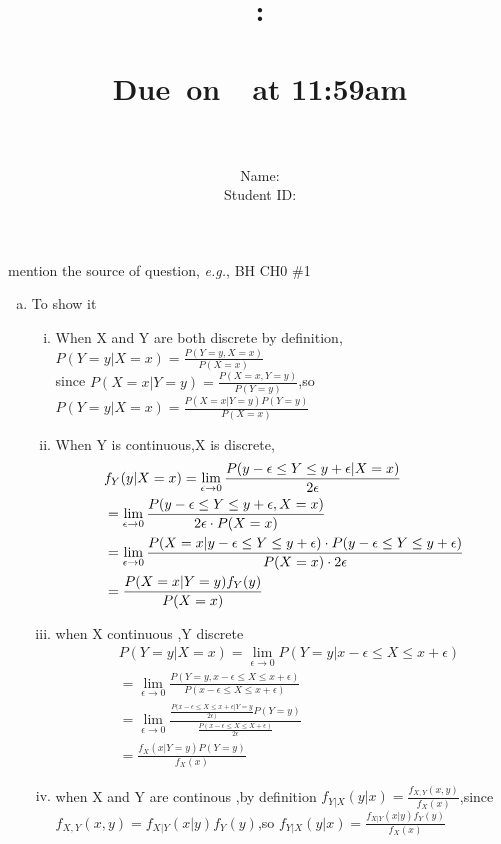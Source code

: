 \documentclass{article}
\title{
    \vspace{2in}
    \textmd{\textbf{\hmwkClass:\\  \hmwkTitle}}\\
    \normalsize\vspace{0.1in}\small{Due\ on\ \hmwkDueDate\ at 11:59am}\\
   \vspace{2in}\Huge{\hmwkClassID}\\   
   \vspace{2in}
}
\author{
	Name: \textbf{\hmwkAuthorName} \\
	Student ID: \hmwkAuthorID}
\date{}
\begin{document}
\maketitle
\pagebreak

\begin{homeworkProblem}{{\color{blue}mention the source of question}, \textit{e.g.}, BH CH0 \#1}

	\begin{enumerate}[(a)]
		\item To show it \begin{enumerate}[(i)]
		\item When X and Y are both discrete by definition,$P(Y=y|X=x)=\frac{P(Y=y,X=x)}{P(X=x)}$ \\since $P(X=x|Y=y)=\frac{P(X=x,Y=y)}{P(Y=y)}$,so $P(Y=y|X=x)=\frac{P(X=x|Y=y)P(Y=y)}{P(X=x)}$
	\item When Y is continuous,X is discrete,
	\begin{equation}	
	\begin{aligned}
&f_Y(y|X=x)=\lim_{\epsilon\to 0}\frac{P(y-\epsilon\leq Y \leq y+\epsilon|X=x)}{2\epsilon}\hfill
\\ &=\lim_{\epsilon\to 0}\frac{P( y-\epsilon\leq Y\leq y+\epsilon,X=x)}{2\epsilon\cdot P(X=x)}
\\ &= \lim_{\epsilon\to 0}\frac{P(X=x|y-\epsilon\leq Y\leq y+\epsilon)\cdot P(y-\epsilon\leq Y\leq y+\epsilon )}{P(X=x)\cdot 2\epsilon}
\\ &=\frac{P(X=x|Y=y)f_Y(y)}{P(X=x)}		
\end{aligned}
\end{equation}
\item  when  X continuous ,Y discrete\begin{equation}
\begin{aligned}
&P(Y=y|X=x)=\lim_{\epsilon\to 0}P(Y=y|x-\epsilon\leq X\leq x+\epsilon)
\\ &=\lim_{\epsilon\to 0}\frac{P(Y=y,x-\epsilon\leq X\leq x+\epsilon)}{P( x-\epsilon \leq X\leq x+\epsilon )}
\\ &=\lim_{\epsilon \to 0}\frac{\frac{P(x-\epsilon\leq X\leq x+\epsilon|Y=y}{2\epsilon)}P(Y=y)}{ \frac{P(x-\epsilon\leq X\leq X+\epsilon)}{2\epsilon}}
\\  &=\frac{f_X(x|Y=y)P(Y=y)}{f_X(x)}
\end{aligned}
\end{equation}
\item when X and Y are continous ,by definition $f_{Y|X}(y|x)=\frac{f_{X,Y}(x,y)}{f_X(x)}$,since $f_{X,Y}(x,y)=f_{X|Y}(x|y)f_Y(y)$,so $f_{Y|X}(y|x)=\frac{f_{X|Y}(x|y)f_{Y}(y)}{f_{X}(x)}$

\end{enumerate}
\end{enumerate}
\end{homeworkProblem}
\end{document}
